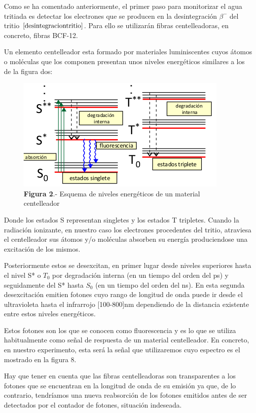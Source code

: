 Como se ha comentado anteriormente, el primer paso para monitorizar el agua tritiada es detectar los electrones que se producen en la desintegración $\beta^-$ del tritio $\eqref{desintegraciontritio}$. Para ello se utilizarán fibras centelleadoras, en concreto, fibras BCF-12. 

Un elemento centelleador esta formado por materiales luminiscentes cuyos átomos o moléculas que los componen presentan unos niveles energéticos similares a los de la figura dos:

\begin{figure}[hbtp]
\centering
\includegraphics[scale=0.7]{EsquemaNivelesFIbras.png}
\caption{\textbf{Figura 2}.- Esquema de niveles energéticos de un material centelleador ~\cite{asignatura}
}
\end{figure}

Donde los estados S representan singletes y los estados T tripletes. Cuando la radiación ionizante, en nuestro caso los electrones procedentes del tritio, atraviesa el centelleador sus átomos y/o moléculas absorben su energía produciendose una excitación de los mismos. 

Posteriormente estos se desexcitan, en primer lugar desde niveles superiores hasta el nivel S* o $T_0$ por degradación interna (en un tiempo del orden del ps) y seguidamente del S* hasta $S_0$ (en un tiempo del orden del ns). En esta segunda desexcitación emitien fotones cuyo rango de longitud de onda puede ir desde el ultravioleta hasta el infrarrojo [100-800]nm dependiendo de la distancia existente entre estos niveles energéticos. 

Estos fotones son los que se conocen como fluorescencia y es lo que se utiliza habitualmente como señal de respuesta de un material centelleador. En concreto, en nuestro experimento, esta será la señal que utilizaremos cuyo espectro es el mostrado en la figura 8.

Hay que tener en cuenta que las fibras centelleadoras son transparentes a los fotones que se encuentran en la longitud de onda de su emisión ya que, de lo contrario, tendríamos una nueva reabsorción de los fotones emitidos antes de ser detectados por el contador de fotones, situación indeseada.

